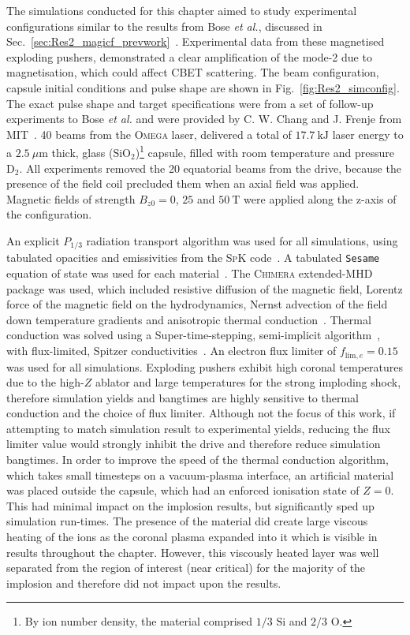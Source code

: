 The simulations conducted for this chapter aimed to study experimental configurations similar to the results from Bose \textit{et al.}, discussed in Sec.~\ref{sec:Res2_magicf_prevwork}~\cite{bose_effect_2022}.
Experimental data from these magnetised exploding pushers, demonstrated a clear amplification of the mode-2 due to magnetisation, which could affect \ac{CBET} scattering.
The beam configuration, capsule initial conditions and pulse shape are shown in Fig.~\ref{fig:Res2_simconfig}.
The exact pulse shape and target specifications were from a set of follow-up experiments to Bose \textit{et al.} and were provided by C. W. Chang and J. Frenje from \ac{MIT}~\cite{chang_notitle_2023}.
40 beams from the \textsc{Omega} laser, delivered a total of $17.7\ \text{kJ}$ laser energy to a $2.5\ \mu\text{m}$ thick, glass ($\text{SiO}_2$)\footnote{By ion number density, the material comprised $1/3$ $\text{Si}$ and $2/3$ $\text{O}$.} capsule, filled with room temperature and pressure $\text{D}_2$.
All experiments removed the 20 equatorial beams from the drive, because the presence of the field coil precluded them when an axial field was applied.
Magnetic fields of strength $B_{z0}=0$, $25$ and $50\ \text{T}$ were applied along the z-axis of the configuration.

An explicit $P_{1/3}$ radiation transport algorithm was used for all simulations, using tabulated opacities and emissivities from the \textsc{SpK} code~\cite{crilly_spk_2023}.
A tabulated \texttt{Sesame} equation of state was used for each material~\cite{mchardy_introduction_2018}.
The \textsc{Chimera} extended-\ac{MHD} package was used, which included resistive diffusion of the magnetic field, Lorentz force of the magnetic field on the hydrodynamics, Nernst advection of the field down temperature gradients and anisotropic thermal conduction~\cite{walsh_extended-magnetohydrodynamics_2020}.
Thermal conduction was solved using a Super-time-stepping, semi-implicit algorithm~\cite{vaidya_scalable_2017}, with flux-limited, Spitzer conductivities~\cite{spitzer_transport_1953}.
An electron flux limiter of $f_{\text{lim},e} = 0.15$ was used for all simulations.
Exploding pushers exhibit high coronal temperatures due to the high-$Z$ ablator and large temperatures for the strong imploding shock, therefore simulation yields and bangtimes are highly sensitive to thermal conduction and the choice of flux limiter.
Although not the focus of this work, if attempting to match simulation result to experimental yields, reducing the flux limiter value would strongly inhibit the drive and therefore reduce simulation bangtimes.
In order to improve the speed of the thermal conduction algorithm, which takes small timesteps on a vacuum-plasma interface, an artificial material was placed outside the capsule, which had an enforced ionisation state of $Z=0$.
This had minimal impact on the implosion results, but significantly sped up simulation run-times.
The presence of the material did create large viscous heating of the ions as the coronal plasma expanded into it which is visible in results throughout the chapter.
However, this viscously heated layer was well separated from the region of interest (near critical) for the majority of the implosion and therefore did not impact upon the results.

